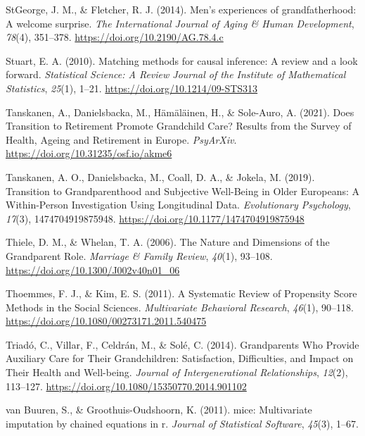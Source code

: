 \documentclass[
  english,
  man, noextraspace,floatsintext]{apa7}
\begin{document}
\leavevmode\hypertarget{ref-stgeorgeMenExperiencesGrandfatherhood2014}{}%
StGeorge, J. M., \& Fletcher, R. J. (2014). Men's experiences of grandfatherhood: A welcome surprise. \emph{The International Journal of Aging \& Human Development}, \emph{78}(4), 351--378. \url{https://doi.org/10.2190/AG.78.4.c}

\leavevmode\hypertarget{ref-stuartMatchingMethodsCausal2010}{}%
Stuart, E. A. (2010). Matching methods for causal inference: A review and a look forward. \emph{Statistical Science: A Review Journal of the Institute of Mathematical Statistics}, \emph{25}(1), 1--21. \url{https://doi.org/10.1214/09-STS313}

\leavevmode\hypertarget{ref-tanskanenDoesTransitionRetirement2021}{}%
Tanskanen, A., Danielsbacka, M., Hämäläinen, H., \& Sole-Auro, A. (2021). Does Transition to Retirement Promote Grandchild Care? Results from the Survey of Health, Ageing and Retirement in Europe. \emph{PsyArXiv}. \url{https://doi.org/10.31235/osf.io/akme6}

\leavevmode\hypertarget{ref-tanskanenTransitionGrandparenthoodSubjective2019}{}%
Tanskanen, A. O., Danielsbacka, M., Coall, D. A., \& Jokela, M. (2019). Transition to Grandparenthood and Subjective Well-Being in Older Europeans: A Within-Person Investigation Using Longitudinal Data. \emph{Evolutionary Psychology}, \emph{17}(3), 1474704919875948. \url{https://doi.org/10.1177/1474704919875948}

\leavevmode\hypertarget{ref-thieleNatureDimensionsGrandparent2006a}{}%
Thiele, D. M., \& Whelan, T. A. (2006). The Nature and Dimensions of the Grandparent Role. \emph{Marriage \& Family Review}, \emph{40}(1), 93--108. \url{https://doi.org/10.1300/J002v40n01_06}

\leavevmode\hypertarget{ref-thoemmesSystematicReviewPropensity2011}{}%
Thoemmes, F. J., \& Kim, E. S. (2011). A Systematic Review of Propensity Score Methods in the Social Sciences. \emph{Multivariate Behavioral Research}, \emph{46}(1), 90--118. \url{https://doi.org/10.1080/00273171.2011.540475}

\leavevmode\hypertarget{ref-triadoGrandparentsWhoProvide2014}{}%
Triadó, C., Villar, F., Celdrán, M., \& Solé, C. (2014). Grandparents Who Provide Auxiliary Care for Their Grandchildren: Satisfaction, Difficulties, and Impact on Their Health and Well-being. \emph{Journal of Intergenerational Relationships}, \emph{12}(2), 113--127. \url{https://doi.org/10.1080/15350770.2014.901102}

\leavevmode\hypertarget{ref-mice2011}{}%
van Buuren, S., \& Groothuis-Oudshoorn, K. (2011). mice: Multivariate imputation by chained equations in r. \emph{Journal of Statistical Software}, \emph{45}(3), 1--67.
\end{document}
